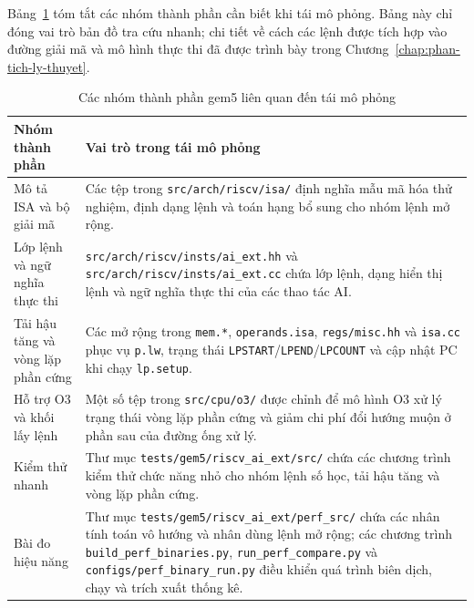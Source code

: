 \documentclass[../DoAn.tex]{subfiles}
\begin{document}
Bảng~\ref{tab:phuluc-gem5-file-map} tóm tắt các nhóm thành phần cần biết khi tái mô phỏng. Bảng này chỉ đóng vai trò bản đồ tra cứu nhanh; chi tiết về cách các lệnh được tích hợp vào đường giải mã và mô hình thực thi đã được trình bày trong Chương~\ref{chap:phan-tich-ly-thuyet}.

\begin{table}[H]
    \centering
    \small
    \renewcommand{\arraystretch}{1.16}
    \begin{tabular}{|>{\raggedright\arraybackslash}p{3.65cm}|>{\raggedright\arraybackslash}p{9.25cm}|}
        \hline
        \textbf{Nhóm thành phần} & \textbf{Vai trò trong tái mô phỏng} \\
        \hline
        Mô tả ISA và bộ giải mã & Các tệp trong \texttt{src/arch/riscv/isa/} định nghĩa mẫu mã hóa thử nghiệm, định dạng lệnh và toán hạng bổ sung cho nhóm lệnh mở rộng. \\
        \hline
        Lớp lệnh và ngữ nghĩa thực thi & \texttt{src/arch/riscv/insts/ai\_ext.hh} và \texttt{src/arch/riscv/insts/ai\_ext.cc} chứa lớp lệnh, dạng hiển thị lệnh và ngữ nghĩa thực thi của các thao tác AI. \\
        \hline
        Tải hậu tăng và vòng lặp phần cứng & Các mở rộng trong \texttt{mem.*}, \texttt{operands.isa}, \texttt{regs/misc.hh} và \texttt{isa.cc} phục vụ \texttt{p.lw}, trạng thái \texttt{LPSTART}/\texttt{LPEND}/\texttt{LPCOUNT} và cập nhật PC khi chạy \texttt{lp.setup}. \\
        \hline
        Hỗ trợ O3 và khối lấy lệnh & Một số tệp trong \texttt{src/cpu/o3/} được chỉnh để mô hình O3 xử lý trạng thái vòng lặp phần cứng và giảm chi phí đổi hướng muộn ở phần sau của đường ống xử lý. \\
        \hline
        Kiểm thử nhanh & Thư mục \texttt{tests/gem5/riscv\_ai\_ext/src/} chứa các chương trình kiểm thử chức năng nhỏ cho nhóm lệnh số học, tải hậu tăng và vòng lặp phần cứng. \\
        \hline
        Bài đo hiệu năng & Thư mục \texttt{tests/gem5/riscv\_ai\_ext/perf\_src/} chứa các nhân tính toán vô hướng và nhân dùng lệnh mở rộng; các chương trình \texttt{build\_perf\_binaries.py}, \texttt{run\_perf\_compare.py} và \texttt{configs/perf\_binary\_run.py} điều khiển quá trình biên dịch, chạy và trích xuất thống kê. \\
        \hline
    \end{tabular}
    \caption{Các nhóm thành phần gem5 liên quan đến tái mô phỏng}
    \label{tab:phuluc-gem5-file-map}
\end{table}
\end{document}
